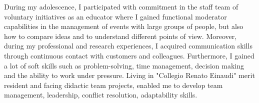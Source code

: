{\begin{cvskills}


\end{cvskills}
\vspace{-5mm}
\begin{cvparagraph}
  During my adolescence, I participated with commitment in the staff team of voluntary initiatives as an educator where I gained functional moderator capabilities in the management of events with large groups of people, but also how to compare ideas and to understand different points of view. Moreover, during my professional and research experiences, I acquired communication skills through continuous contact with customers and colleagues. Furthermore, I gained a lot of soft skills such as problem-solving, time management, decision making and the ability to work under pressure. Living in "Collegio Renato Einaudi" merit resident and facing didactic team projects, enabled me to develop team management, leadership, conflict resolution, adaptability skills.
\end{cvparagraph}
}